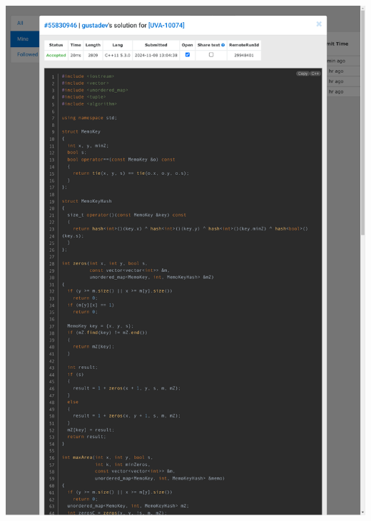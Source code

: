 \documentclass[a4paper, 12pt]{article}
\begin{document}
\includegraphics[clip, trim=40 0 40 25, width=17cm]{10074/submit-1.pdf}\vspace{-2cm}
\end{document}
